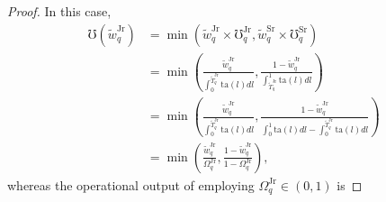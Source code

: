 \documentclass[hidelinks, nonatbib]{elsarticle}
\begin{document}
\begin{lemma}
\begin{proof}
        In this case,
        \begin{align}
            \mho(\tilde{w}_{q}^{\text{Jr}})
            &=
            \min\left(
                \tilde{w}_{q}^{\text{Jr}}
                \times
                \mho_{q}^{\text{Jr}}
                ,
                \tilde{w}_{q}^{\text{Sr}}
                \times
                \mho_{q}^{\text{Sr}}
            \right)
            \\
            &=
            \min\left(
                \frac{
                    \tilde{w}_{q}^{\text{Jr}}
                }{
                    \int_{0}^{
                        \tilde{T}_{q}^{\text{Jr}}
                    }{
                        \text{ta}(l)
                        dl
                    }
                }
                ,
                \frac{
                    1 - \tilde{w}_{q}^{\text{Jr}}
                }{
                    \int_{
                        \tilde{T}_{q}^{\text{Jr}}
                    }^{1}{
                        \text{ta}(l)
                        dl
                    }
                }
            \right)
            \\
            &=
            \min\left(
                \frac{
                    \tilde{w}_{q}^{\text{Jr}}
                }{
                    \int_{0}^{
                        \tilde{T}_{q}^{\text{Jr}}
                    }{
                        \text{ta}(l)
                        dl
                    }
                }
                ,
                \frac{
                    1 - \tilde{w}_{q}^{\text{Jr}}
                }{
                    \int_{0}^{1}{
                        \text{ta}(l)
                        dl
                    }
                    -
                    \int_{0}^{
                        \tilde{T}_{q}^{\text{Jr}}
                    }{
                        \text{ta}(l)
                        dl
                    }
                }
            \right)
            \\
            &=
            \min\left(
                \frac{
                    \tilde{w}_{q}^{\text{Jr}}
                }{
                    \Omega_{q}^{\text{Jr}}
                }
                ,
                \frac{
                    1 - \tilde{w}_{q}^{\text{Jr}}
                }{
                    1 - \Omega_{q}^{\text{Jr}}
                }
            \right)
            ,
        \end{align}
        whereas the operational output of employing $\Omega_{q}^{\text{Jr}} \in (0,1)$ is

\end{proof}
\end{lemma}
\end{document}
